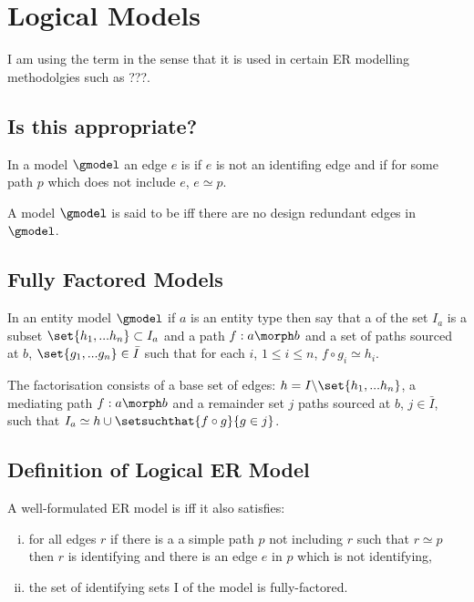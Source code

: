 
\section{Logical Models}
I am using the term  in the sense that it is used in certain ER modelling methodolgies such as ???.

\subsection{Is this appropriate?}
\begin{definition}
In a model $\gmodel$ an edge $e$ is  if $e$ is not an identifing edge and if for some path $p$
which does not include $e$, $e \simeq p$.
\end{definition}

\begin{definition}
A model $\gmodel$ is said to be  iff there are no design redundant edges in $\gmodel$.
\end{definition}

\subsection{Fully Factored Models}

\begin{definition}
In an entity model $\gmodel$ if $a$ is an entity type then say that
a  of the set $I_a$ is a subset $\set{h_1,...h_n} \subset I_a$ 
and a  path $f:a \morph b$ and a set of paths sourced at $b$, $\set{g_1,...g_n} \in \bar{I}$
such that for each $i$, $1 \leq i \leq n$, $f \circ g_i \simeq h_i$. 
\end{definition}

The factorisation consists  
of a base set of edges: $h=I \backslash \set{h_1,...h_n}$, a mediating path $f:a \morph b$ and a remainder 
set $j$ paths sourced at $b$, $j \in \bar{I}$, 
such that $I_a \simeq h \cup \setsuchthat{f\circ g}{g \in j}$.


\subsection{Definition of Logical ER Model}
\begin{definition}
A well-formulated ER model is   iff it 
also satisfies:
\begin{enumerate}[(i)]
\item
for all edges $r$ if there is a
a simple path $p$  not including $r$ such that
 $r \simeq p$  then $r$ is identifying and there is an edge $e$ in $p$ which is not identifying,
\item the set of identifying sets I of the model is fully-factored.
\end{enumerate} 
\end{definition}

